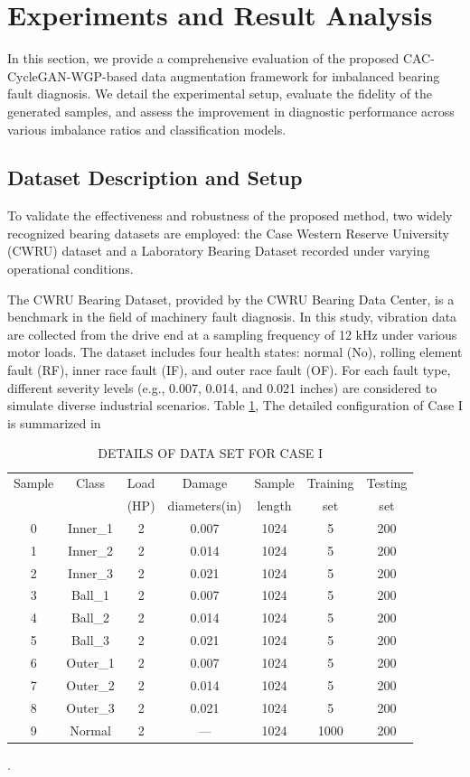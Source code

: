 \documentclass[twocolumn]{IEEEtran}
\begin{document}
\section{Experiments and Result Analysis}
In this section, we provide a comprehensive evaluation of the proposed CAC-CycleGAN-WGP-based data augmentation framework for imbalanced bearing fault diagnosis. We detail the experimental setup, evaluate the fidelity of the generated samples, and assess the improvement in diagnostic performance across various imbalance ratios and classification models.

\subsection{Dataset Description and Setup}
To validate the effectiveness and robustness of the proposed method, two widely recognized bearing datasets are employed: the Case Western Reserve University (CWRU) dataset \cite{Smith2015} and a Laboratory Bearing Dataset recorded under varying operational conditions.

The CWRU Bearing Dataset, provided by the CWRU Bearing Data Center, is a benchmark in the field of machinery fault diagnosis. In this study, vibration data are collected from the drive end at a sampling frequency of 12 kHz under various motor loads. The dataset includes four health states: normal (No), rolling element fault (RF), inner race fault (IF), and outer race fault (OF). For each fault type, different severity levels (e.g., 0.007, 0.014, and 0.021 inches) are considered to simulate diverse industrial scenarios. Table \ref{tab:dataset_caseI}, The detailed configuration of Case I is summarized in \begin{table}[htbp]
\centering
\caption{DETAILS OF DATA SET FOR CASE I}
\label{tab:dataset_caseI}
\begin{tabular}{ccccccc}
\hline
Sample & Class & Load & Damage & Sample & Training & Testing \\
 & & (HP) & diameters(in) & length & set & set \\
\hline
0 & Inner\_1 & 2 & 0.007 & 1024 & 5 & 200 \\
1 & Inner\_2 & 2 & 0.014 & 1024 & 5 & 200 \\
2 & Inner\_3 & 2 & 0.021 & 1024 & 5 & 200 \\
3 & Ball\_1 & 2 & 0.007 & 1024 & 5 & 200 \\
4 & Ball\_2 & 2 & 0.014 & 1024 & 5 & 200 \\
5 & Ball\_3 & 2 & 0.021 & 1024 & 5 & 200 \\
6 & Outer\_1 & 2 & 0.007 & 1024 & 5 & 200 \\
7 & Outer\_2 & 2 & 0.014 & 1024 & 5 & 200 \\
8 & Outer\_3 & 2 & 0.021 & 1024 & 5 & 200 \\
9 & Normal & 2 & --- & 1024 & 1000 & 200 \\
\hline
\end{tabular}
\end{table}. 
\end{document}
